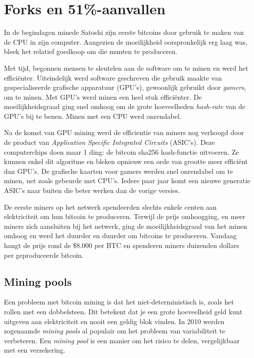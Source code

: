\chapter{Forks en 51\%-aanvallen}
In de begindagen minede Satoshi zijn eerste bitcoins door gebruik te maken van de CPU in zijn computer. Aangezien de moeilijkheid oorspronkelijk erg laag was, bleek het relatief goedkoop om die munten te produceren.

Met tijd, begonnen mensen te sleutelen aan de software om te minen en werd het efficiënter. Uiteindelijk werd software geschreven die gebruik maakte van gespecialiseerde grafische apparatuur (GPU’s), gewoonlijk gebruikt door \textit{gamers}, om te minen. Met GPU’s werd minen een heel stuk efficiënter. De moeilijkheidsgraad ging snel omhoog om de grote hoeveelheden \textit{hash-rate} van de GPU’s bij te benen. Minen met een CPU werd onrendabel.

Na de komst van GPU mining werd de efficientie van miners nog verhoogd door de product van \textit{Application Specific Integrated Circuits} (ASIC’s). Deze computerchips doen maar 1 ding: de bitcoin sha256 hash-functie uitvoeren. Ze kunnen enkel dit algoritme en bleken opnieuw een orde van grootte meer efficiënt dan GPU’s. De grafische kaarten voor gamers werden snel onrendabel om te minen, net zoals gebeurde met CPU’s. Iedere paar jaar komt een nieuwe generatie ASIC’s naar buiten die beter werken dan de vorige versies.

De eerste miners op het netwerk spendeerden slechts enkele centen aan elektriciteit om hun bitcoin te produceren. Terwijl de prijs omhoogging, en meer miners zich aansluiten bij het netwerk, ging de moeilijkheidsgraad van het minen omhoog en werd het duurder en duurder om bitcoins te produceren. Vandaag hangt de prijs rond de \$8.000 per BTC en spenderen miners duizenden dollars per geproduceerde bitcoin.

\section{Mining pools}
Een probleem met bitcoin mining is dat het niet-deterministisch is, zoals het rollen met een dobbelsteen. Dit betekent dat je een grote hoeveelheid geld kunt uitgeven aan elektriciteit en nooit een geldig blok vinden. In 2010 werden zogenaamde \textit{mining pools} al populair om het probleem van variabiliteit te verbeteren. Een \textit{mining pool} is een manier om het risico te delen, vergelijkbaar met een verzekering.

